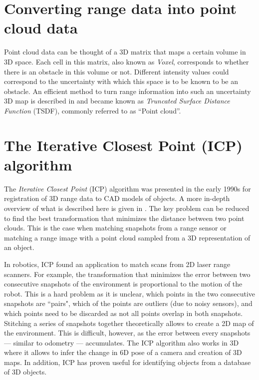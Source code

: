 \documentclass[paper=6.14in:9.21in,pagesize=pdftex,11pt,twoside,openright]{scrbook}
\begin{document}
\section{Converting range data into point cloud data}
Point cloud data can be thought of a 3D matrix that maps a certain volume in 3D space. Each cell in this matrix, also known as \emph{Voxel}, corresponds to whether there is an obstacle in this volume or not. Different intensity values could correspond to the uncertainty with which this space is to be known to be an obstacle. An efficient method to turn range information into such an uncertainty 3D map is described in \cite{curless96} and became known as \emph{Truncated Surface Distance Function} (TSDF), commonly referred to as ``Point cloud''.

\section{The Iterative Closest Point (ICP) algorithm}
The \emph{Iterative Closest Point} (ICP) algorithm was presented in the early 1990s for registration of 3D range data to CAD models of objects. A more in-depth overview of what is described here is given in \cite{rusinkiewicz01}. The key problem can be reduced to find the best transformation that minimizes the distance between two point clouds. This is the case when matching snapshots from a range sensor or matching a range image with a point cloud sampled from a 3D representation of an object.

In robotics, ICP found an application to match scans from 2D laser range scanners. For example, the transformation that minimizes the error between two consecutive snapshots of the environment is proportional to the motion of the robot. This is a hard problem as it is unclear, which points in the two consecutive snapshots are ``pairs", which of the points are outliers (due to noisy sensors), and which points need to be discarded as not all points overlap in both snapshots. Stitching a series of snapshots together theoretically allows to create a 2D map of the environment. This is difficult, however, as the error between every snapshots --- similar to odometry --- accumulates.   The ICP algorithm also works in 3D where it allows to infer the change in 6D pose of a camera and creation of 3D maps. In addition, ICP has proven useful for identifying objects from a database of 3D objects.
\end{document}
